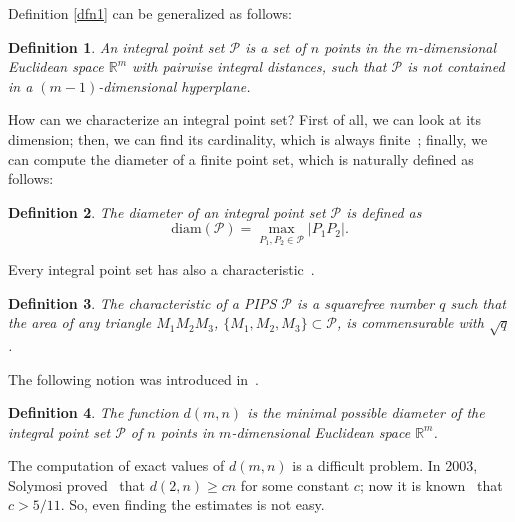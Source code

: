 \documentclass[12pt]{article}
\theoremstyle{theorem}
\theoremstyle{dfn}
\newtheorem{dfn}{Definition}
\theoremstyle{remark}
\begin{document}
Definition \ref{dfn1} can be generalized as follows:

\begin{dfn}
	An integral point set $\mathcal{P}$ is a set of $n$ points in
	the $m$-dimensional Euclidean space $\mathbb{R}^{m}$ with pairwise
	integral distances,
	such that $\mathcal{P}$ is not contained in a $(m-1)$-dimensional hyperplane.
\end{dfn}

How can we characterize an integral point set?
First of all, we can look at its dimension;
then, we can find its cardinality, which is always finite~\cite{anning1945integral,erdos1945integral};
finally, we can compute the diameter of a finite point set,
which is naturally defined as follows:

\begin{dfn}
	The diameter of an integral point set $\mathcal{P}$ is defined as
	\begin{equation}
		\operatorname{diam(\mathcal{P})} = \underset{P_{1}, P_{2} \in
		\mathcal{P}}{\max} |P_{1}P_{2}|
		.
	\end{equation}
\end{dfn}

Every integral point set has also a characteristic~\cite{kemnitz1988punktmengen,kurz2005characteristic}.

\begin{dfn}
	The characteristic of a PIPS $\mathcal{P}$ is a squarefree number $q$
	such that the area of any triangle $M_1M_2M_3$, $\{M_1,M_2,M_3\}\subset \mathcal{P}$,
	is commensurable with $\sqrt{q}$.
\end{dfn}

The following notion was introduced in~\cite{kurz2008bounds}.

\begin{dfn}
	The function $d(m, n)$ is the minimal possible diameter of
	the integral point set $\mathcal{P}$ of $n$ points in
	$m$-dimensional Euclidean space $\mathbb{R}^{m}$.
\end{dfn}

The computation of exact values of $d(m,n)$ is a difficult problem.
In 2003, Solymosi proved~\cite{solymosi2003note} that $d(2,n) \geq cn$ for some constant $c$;
now it is known~\cite{my-pps-linear-bound-2019} that $c>5/11$.
So, even finding the estimates is not easy.

%
\end{document}
